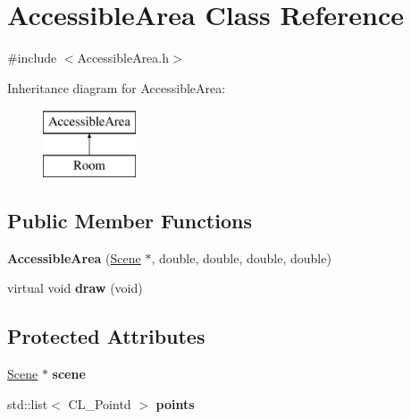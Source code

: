 \hypertarget{classAccessibleArea}{
\section{AccessibleArea Class Reference}
\label{classAccessibleArea}
}


{\ttfamily \#include $<$AccessibleArea.h$>$}

Inheritance diagram for AccessibleArea:\begin{figure}[H]
\begin{center}
\leavevmode
\includegraphics[height=2cm]{classAccessibleArea}
\end{center}
\end{figure}
\subsection*{Public Member Functions}
\begin{DoxyCompactItemize}
\item 
\hypertarget{classAccessibleArea_a2f00691133643b196a7f695c3d7f36be}{
{\bfseries AccessibleArea} (\hyperlink{classScene}{Scene} $\ast$, double, double, double, double)}
\label{classAccessibleArea_a2f00691133643b196a7f695c3d7f36be}

\item 
\hypertarget{classAccessibleArea_a77376ad943429e7acd10403ff70a4105}{
virtual void {\bfseries draw} (void)}
\label{classAccessibleArea_a77376ad943429e7acd10403ff70a4105}

\end{DoxyCompactItemize}
\subsection*{Protected Attributes}
\begin{DoxyCompactItemize}
\item 
\hypertarget{classAccessibleArea_a41e88a8d1e45ba68b18f09da81623417}{
\hyperlink{classScene}{Scene} $\ast$ {\bfseries scene}}
\label{classAccessibleArea_a41e88a8d1e45ba68b18f09da81623417}

\item 
\hypertarget{classAccessibleArea_ab73273146fc9a7f5b56014d6009dc9d8}{
std::list$<$ CL\_\-Pointd $>$ {\bfseries points}}
\label{classAccessibleArea_ab73273146fc9a7f5b56014d6009dc9d8}

\end{DoxyCompactItemize}


